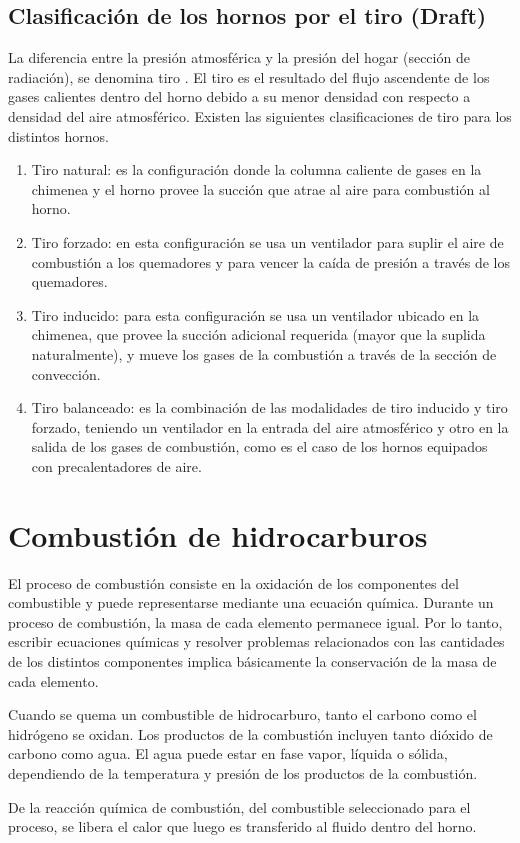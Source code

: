 \subsection{Clasificación de los hornos por el tiro (Draft)}
\par La diferencia entre la presión atmosférica y la presión del hogar (sección de radiación), se denomina tiro \cite{bib:draft}. El tiro es el resultado del flujo ascendente de los gases calientes dentro del horno debido a su menor densidad con respecto a densidad del aire atmosférico. Existen las siguientes clasificaciones de tiro para los distintos hornos.
\begin{enumerate}
    \item Tiro natural: es la configuración donde la columna caliente de gases en la chimenea y el horno provee la succión que atrae al aire para combustión al horno.
    \item Tiro forzado: en esta configuración se usa un ventilador para suplir el aire de combustión a los quemadores y para vencer la caída de presión a través de los quemadores.
    \item Tiro inducido: para esta configuración se usa un ventilador ubicado en la chimenea, que provee la succión adicional requerida (mayor que la suplida naturalmente), y mueve los gases de la combustión a través de la sección de convección.
    \item Tiro balanceado: es la combinación de las modalidades de tiro inducido y tiro forzado, teniendo un ventilador en la entrada del aire atmosférico y otro en la salida de los gases de combustión, como es el caso de los hornos equipados con precalentadores de aire.
\end{enumerate}

\section{Combustión de hidrocarburos}

\par El proceso de combustión consiste en la oxidación de los componentes del combustible y puede representarse mediante una ecuación química. Durante un proceso de combustión, la masa de cada elemento permanece igual. Por lo tanto, escribir ecuaciones químicas y resolver problemas relacionados con las cantidades de los distintos componentes implica básicamente la conservación de la masa de cada elemento. 
\par Cuando se quema un combustible de hidrocarburo, tanto el carbono como el hidrógeno se oxidan. Los productos de la combustión incluyen tanto dióxido de carbono como agua. El agua puede estar en fase vapor, líquida o sólida, dependiendo de la temperatura y presión de los productos de la combustión.
\par De la reacción química de combustión, del combustible seleccionado para el proceso, se libera el calor que luego es transferido al fluido dentro del horno.

